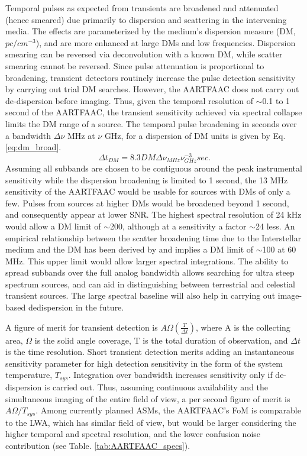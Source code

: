 \documentclass{aa}
\begin{document}
Temporal pulses as expected from  transients are broadened and attenuated (hence
smeared)  due  primarily  to   dispersion  and  scattering  in  the  intervening
media. The  effects are  parameterized by the  medium's dispersion  measure (DM,
$pc/cm^{-3}$),    and   are    more   enhanced    at   large    DMs    and   low
frequencies. Dispersion smearing can be  reversed via deconvolution with a known
DM,  while scatter  smearing cannot  be  reversed.  Since  pulse attenuation  is
proportional  to broadening,  transient detectors  routinely increase  the pulse
detection sensitivity by carrying out  trial DM searches.  However, the AARTFAAC
does  not carry  out de-dispersion  before  imaging.  Thus,  given the  temporal
resolution of $\sim$0.1  to 1 second of the  AARTFAAC, the transient sensitivity
achieved via  spectral collapse limits the  DM range of a  source.  The temporal
pulse broadening in seconds over a bandwidth $\Delta\nu$ MHz at $\nu$ GHz, for a
dispersion of DM units is given by Eq. \ref{eq:dm_broad}.
\begin{equation}
\Delta t_{DM}=8.3DM\Delta\nu_{MHz}\nu_{GHz}^{-3} sec.\label{eq:dm_broad}
\end{equation}
Assuming all subbands  are chosen to be contiguous  around the peak instrumental
sensitivity while the  dispersion broadening is limited to 1  second, the 13 MHz
sensitivity  of the AARTFAAC  would be  usable for  sources with  DMs of  only a
few. Pulses from  sources at higher DMs would be broadened  beyond 1 second, and
consequently appear  at lower  SNR.  The highest  spectral resolution of  24 kHz
would allow a DM limit of $\sim$200, although at a sensitivity a factor $\sim$24
less.  An empirical relationship between  the scatter broadening time due to the
Interstellar     medium     and    the     DM     has     been    derived     by
\citet{bhat2004multifrequency}  and  implies  a  DM  limit of  $\sim$100  at  60
MHz. This upper  limit would allow larger spectral  integrations. The ability to
spread subbands over the full  analog bandwidth allows searching for ultra steep
spectrum  sources,  and  can  aid  in  distinguishing  between  terrestrial  and
celestial  transient sources.   The large  spectral baseline  will also  help in
carrying out image-based dedispersion in the future.

A   figure  of   merit  for   transient   detection \citep{cordes2004dynamic}  is
$A\Omega\left(\frac{T}{\Delta  t}\right)$,  where  A  is  the  collecting  area,
$\Omega$ is  the solid angle coverage,  T is the total  duration of observation,
and $\Delta t$  is the time resolution. Short  transient detection merits adding
an  instantaneous sensitivity parameter  for high  detection sensitivity  in the
form of the system  temperature, $T_{sys}$. Integration over bandwidth increases
sensitivity  only if de-dispersion  is carried  out.  Thus,  assuming continuous
availability and  the simultaneous imaging  of the entire  field of view,  a per
second figure of  merit is $A\Omega/T_{sys}$. Among currently  planned ASMs, the
AARTFAAC's FoM  is comparable to the LWA,  which has similar field  of view, but
would be larger considering the higher temporal and spectral resolution, and the
lower confusion noise contribution (see Table. \ref{tab:AARTFAAC_specs}).
\end{document}
